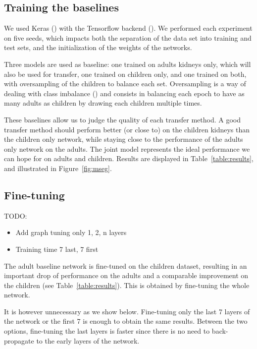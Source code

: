 \subsection{Training the baselines}
\label{ssec:training_baseline}

We used Keras (\textcite{chollet2015keras}) with the Tensorflow backend (\textcite{tensorflow2015}). We performed each experiment on five seeds, which impacts both the separation of the data set into training and test sets, and the initialization of the weights of the networks.

Three models are used as baseline: one trained on adults kidneys only, which will also be used for transfer, one trained on children only, and one trained on both, with oversampling of the children to balance each set. Oversampling is a way of dealing with class imbalance (\textcite{buda2017}) and consists in balancing each epoch to have as many adults as children by drawing each children multiple times.

These baselines allow us to judge the quality of each transfer method. A good transfer method should perform better (or close to) on the children kidneys than the children only network, while staying close to the performance of the adults only network on the adults. The joint model represents the ideal performance we can hope for on adults and children. Results are displayed in Table~\ref{table:results}, and illustrated in Figure~\ref{fig:mseg}.

\subsection{Fine-tuning}
\label{ssec:baseline_finetune}

TODO:
\begin{itemize}
    \item Add graph tuning only 1, 2, n layers
    \item Training time 7 last, 7 first
\end{itemize}

The adult baseline network is fine-tuned on the children dataset, resulting in an important drop of performance on the adults and a comparable improvement on the children (see Table~\ref{table:results}). This is obtained by fine-tuning the whole network. 

It is however unnecessary as we show below. Fine-tuning only the last 7 layers of the network or the first 7 is enough to obtain the same results. Between the two options, fine-tuning the last layers is faster since there is no need to back-propagate to the early layers of the network.


